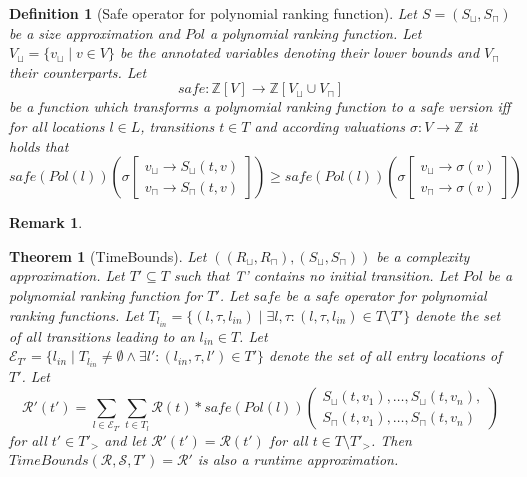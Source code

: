 \documentclass{scrartcl}
\newtheorem{theorem}{Theorem}
\newtheorem{definition}{Definition}
\newtheorem{remark}{Remark}
\begin{document}
\begin{definition}[Safe operator for polynomial ranking function]
	Let $S = (S_\sqcup, S_\sqcap)$ be a size approximation and $\mathit{Pol}$ a polynomial ranking function.
	Let $V_\sqcup = \lbrace v_\sqcup \mid v \in V \rbrace$ be the annotated variables denoting their lower bounds and $V_\sqcap$ their counterparts.
	Let 
	\[ \mathit{safe}: \mathbb{Z}[V] \rightarrow \mathbb{Z}[V_\sqcup \cup V_\sqcap] \]
	be a function which transforms a polynomial ranking function to a safe version iff for all locations $l \in L$, transitions $t \in T$ and according valuations $\sigma: V \rightarrow \mathbb{Z}$ it holds that
	\[ 
		\mathit{safe}(\mathit{Pol}(l))(\sigma
			\left[ \begin{array}{c}
				v_\sqcup \rightarrow S_\sqcup(t, v)\\
			    v_\sqcap \rightarrow S_\sqcap(t, v)
			\end{array} \right] )
		\geq
		\mathit{safe}(\mathit{Pol}(l))(\sigma
			\left[ \begin{array}{c}
			    v_\sqcup \rightarrow \sigma(v)\\
				v_\sqcap \rightarrow \sigma(v)
			\end{array} \right] )
	\]
\end{definition}

\begin{remark}
\end{remark}

\begin{theorem}[TimeBounds]
	Let $((R_\sqcup, R_\sqcap), (S_\sqcup, S_\sqcap))$ be a complexity approximation.
	Let $T' \subseteq T$ such that T' contains no initial transition.
	Let $\mathit{Pol}$ be a polynomial ranking function for $T'$.
	Let $\mathit{safe}$ be a safe operator for polynomial ranking functions.
	Let $T_{l_{\mathit{in}}} = \lbrace (l, \tau, l_{\mathit{in}}) \mid \exists l, \tau: (l, \tau, l_{\mathit{in}}) \in T \setminus T' \rbrace$ denote the set of all transitions leading to an $l_{\mathit{in}} \in T$.
	Let $\mathcal{E}_{T'} = \lbrace l_{\mathit{in}} \mid T_{l_{\mathit{in}}} \neq \emptyset \wedge \exists l': (l_{\mathit{in}}, \tau, l') \in T' \rbrace$ denote the set of all entry locations of $T'$.
	Let
	\[ \mathcal{R}'(t') = \sum_{l \in \mathcal{E}_{T'}} \sum_{t \in T_l} \mathcal{R}(t) *
		\mathit{safe}(\mathit{Pol}(l))		
			\left( \begin{array}{c}
				S_\sqcup(t, v_1), \dots, S_\sqcup(t, v_n),\\
				S_\sqcap(t, v_1), \dots, S_\sqcap(t, v_n)
			\end{array} \right)
	\]
	for all $t' \in T'_>$ and let $\mathcal{R}'(t')=\mathcal{R}(t')$ for all $t \in T \setminus T'_>$.
	Then $\mathit{TimeBounds}(\mathcal{R}, \mathcal{S}, T') = \mathcal{R}'$ is also a runtime approximation.
\end{theorem}
\end{document}
